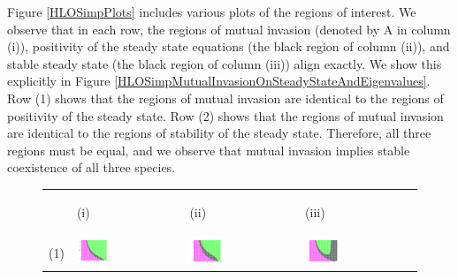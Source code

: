 \documentclass[12pt]{UOthesis}
\theoremstyle{remarkstyle}
\begin{document}
Figure \ref{HLOSimpPlots} includes various plots of the regions of interest. We observe that in each row, the regions of mutual invasion (denoted by A in column (i)), positivity of the steady state equations (the black region of column (ii)), and stable steady state (the black region of column (iii)) align exactly. We show this explicitly in Figure \ref{HLOSimpMutualInvasionOnSteadyStateAndEigenvalues}. Row (1) shows that the regions of mutual invasion are identical to the regions of positivity of the steady state. Row (2) shows that the regions of mutual invasion are identical to the regions of stability of the steady state. Therefore, all three regions must be equal, and we observe that mutual invasion implies stable coexistence of all three species.\\
\begin{figure}[h!]
	\centering
	\begin{tabular}{m{0.07cm} m{4.5cm}  m{4.5cm}  m{4.5cm}}
		& \begin{center}
			(i)
		\end{center} & \begin{center}
			(ii)
		\end{center} & \begin{center}
			(iii)
		\end{center}\\
	(1) & \includegraphics[width=0.33\textwidth]{HLOSimpMutualInvasionOnSteadyState1.png} & \includegraphics[width=0.33\textwidth]{HLOSimpMutualInvasionOnSteadyState2.png} & \includegraphics[width=0.33\textwidth]{HLOSimpMutualInvasionOnSteadyState3.png}\\

\end{tabular}
\end{figure}
\end{document}
